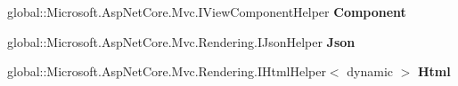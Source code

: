 \begin{DoxyCompactItemize}
global\+::\+Microsoft.\+Asp\+Net\+Core.\+Mvc.\+I\+View\+Component\+Helper {\bfseries Component}
\item 
\mbox{\label{class_asp_net_core_1_1_views___shared_____login_partial_a2e14ff989df6aeca3b6e4871843774a8}} 
global\+::\+Microsoft.\+Asp\+Net\+Core.\+Mvc.\+Rendering.\+I\+Json\+Helper {\bfseries Json}
\item 
\mbox{\label{class_asp_net_core_1_1_views___shared_____login_partial_a6aa5c29422b69d2073ced9d355c16b88}} 
global\+::\+Microsoft.\+Asp\+Net\+Core.\+Mvc.\+Rendering.\+I\+Html\+Helper$<$ dynamic $>$ {\bfseries Html}
\end{DoxyCompactItemize}
